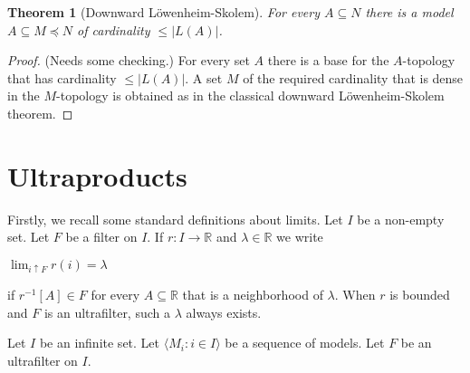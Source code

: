\documentclass[12pt,letterpaper,oneside,reqno]{amsart}
\theoremstyle{plain}
\newtheorem{theorem}{Theorem}%
\theoremstyle{remark}
\begin{document}
\begin{theorem}[Downward L\"owenheim-Skolem] For every $A\subseteq N$ there is a model $A\subseteq M\preceq N$ of cardinality $\le |L(A)|$.
\end{theorem}
\begin{proof} (Needs some checking.)
  For every set $A$ there is a base for the $A\mbox{-}$topology that has cardinality $\le |L(A)|$. A set $M$ of the required cardinality that is dense in the  $M\mbox{-}$topology is obtained as in the classical downward L\"owenheim-Skolem theorem.
\end{proof}

\section{Ultraproducts}\label{ultrapws}



Firstly, we recall some standard definitions about limits.
Let $I$ be a non-empty set.
Let $F$ be a filter on $I$.
If $r:I\to{\mathds R}$ and $\lambda\in{\mathds R}$ we write

\hfil$\displaystyle \lim_{i\uparrow F}r(i)=\lambda$

if $r^{-1}[A]\in F$ for every $A\subseteq{\mathds R}$ that is a neighborhood of $\lambda$.
When $r$ is bounded and $F$ is an ultrafilter, such a $\lambda$ always exists.

Let $I$ be an infinite set.
Let $\langle M_i:i\in I\rangle$ be a sequence of models.
Let $F$ be an ultrafilter on $I$.
\end{document}

